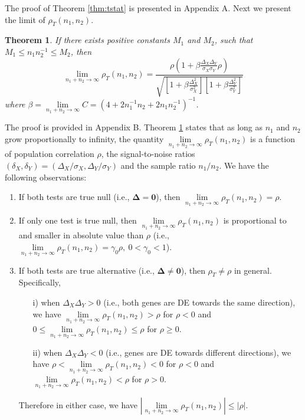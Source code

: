 \documentclass[review]{elsarticle}
\newtheorem{theorem}{Theorem}       %
\begin{document}
The proof of Theorem \ref{thm:tstat} is presented in Appendix A. Next 
we present the limit of $\rho_T(n_1,n_2)$.
\begin{theorem}\label{thm:rholimit}
	If there exists positive constants $M_1$ and $M_2$, such that $M_1 \leq n_1n_2^{-1}\leq 
	M_2$, then
	\begin{equation}\label{eq:limitT}
	\lim\limits_{n_1 + n_2 \rightarrow \infty} \rho_T(n_1, n_2) = \frac{\rho(1  +
		\beta\frac{\Delta_X\Delta_Y}{\sigma_X\sigma_Y}\rho)}{\sqrt{  \left[ 1 
			+\beta\frac{\Delta_X^2}{\sigma_X^2}\right]\left[ 1 + 
			\beta\frac{\Delta_Y^2}{\sigma_Y^2}\right]}}
	\end{equation}
	where %
	$\beta = \lim\limits_{n_1 + n_2 \rightarrow \infty}C = (4 + 2n_1^{-1}n_2 + 
	2n_1n_2^{-1})^{-1}$.
\end{theorem}
The proof is provided in Appendix B. Theorem \ref{thm:rholimit} states that as long as $n_1$ and $n_2$ grow proportionally to 
infinity, the quantity $\lim\limits_{n_1 + n_2 \rightarrow \infty} \rho_T(n_1, n_2)$ is a function 
of population correlation $\rho$, the 
signal-to-noise ratios $(\delta_X, \delta_Y) = (\Delta_X/\sigma_X, \Delta_Y/\sigma_Y)$  and the 
sample ratio $n_1/n_2$. 
We have the following observations:
\begin{enumerate}
	\item If both tests are true null (i.e., $\bm \Delta = \bm 0$), then $\lim\limits_{n_1 + n_2 
		\rightarrow \infty} \rho_T(n_1, n_2) = \rho$.
	\item If only one test is true null, then $\lim\limits_{n_1 + n_2 \rightarrow \infty} 
	\rho_T(n_1, n_2)$ is proportional to and smaller in 
	absolute value than $\rho$ (i.e., $\lim\limits_{n_1 + n_2 \rightarrow \infty} \rho_T(n_1, n_2) 
	= \gamma_0\rho,~ 0 <\gamma_0 <1$).
	\item If both tests are true alternative (i.e., $\bm \Delta \neq \bm 0$), then $\rho_T\neq 
	\rho$ in general. Specifically,
	\begin{enumerate}
		\item[i)]  when $\Delta_X\Delta_Y >0$ (i.e., both genes are DE towards the same 
		direction), we have $\lim\limits_{n_1 + n_2 \rightarrow \infty} \rho_T(n_1, n_2)>\rho$ for 
		$\rho <0$ and $0 \leq \lim\limits_{n_1 + n_2 \rightarrow \infty} \rho_T(n_1, n_2) \leq\rho$ 
		for $\rho 
		\geq 0$.
		\item[ii)] when $\Delta_X\Delta_Y <0$ (i.e., genes are DE towards different 
		directions), we have
		$\rho <\lim\limits_{n_1 + n_2 \rightarrow \infty} \rho_T(n_1, n_2)<0$ for $\rho <0$ and 
		$\lim\limits_{n_1 + n_2 \rightarrow \infty} \rho_T(n_1, n_2)<\rho$ for $\rho>0$.
	\end{enumerate}
	Therefore in either case, we have $|\lim\limits_{n_1 + n_2 \rightarrow \infty} \rho_T(n_1, 
	n_2)| \leq |\rho|$. 
\end{enumerate}
			
\end{document}
